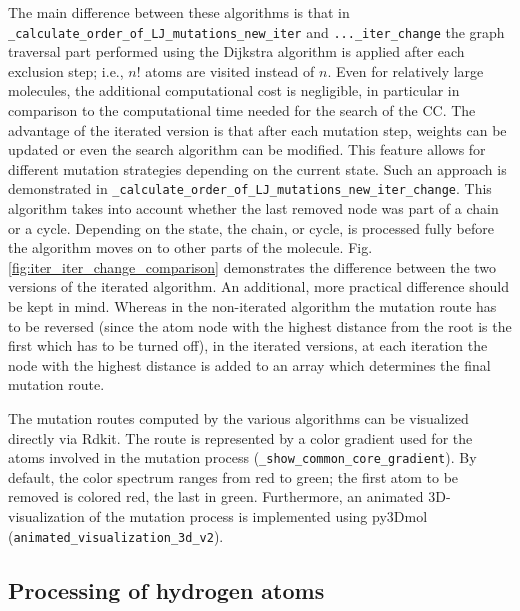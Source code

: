 The main difference between these algorithms is that in \texttt{\_calculate\_order\_of\_LJ\_mutations\_new\_iter}
and \texttt{...\_iter\_change} the graph traversal part performed
using the Dijkstra algorithm is applied after each exclusion step; i.e., $n!$ atoms are visited instead of $n$. Even for relatively large molecules, the additional computational cost is negligible, in particular in comparison
to the computational time needed for the search of the CC.
The advantage of the iterated version is that after each mutation step, weights can be
updated or even the search algorithm can be modified. 
This feature allows for different mutation strategies depending
on the current state. Such an approach is demonstrated in \texttt{\_calculate\_order\_of\_LJ\_mutations\_new\_iter\_change}.
This algorithm takes into account whether the last removed node was part of a chain or a cycle. Depending
on the state, the chain, or cycle, is processed fully before the algorithm
moves on to other parts of the molecule. Fig. \ref{fig:iter_iter_change_comparison} demonstrates the difference between the two versions of the iterated algorithm. An additional, more practical difference should be kept in mind.
Whereas in the non-iterated algorithm the mutation route has to be reversed (since the atom node with the highest distance from the root is the first which has to be turned off), in the iterated versions, at each iteration the node with the highest distance is added to an array which determines the final mutation route.

The mutation routes computed by the various algorithms can be visualized directly via Rdkit. 
The route is represented by a color gradient used for the atoms involved
in the mutation process (\texttt{\_show\_common\_core\_gradient}). By default, the color spectrum ranges from red to green; the first atom to be removed is colored red, the last in green. 
Furthermore, an animated 3D-visualization of the mutation process
is implemented using py3Dmol (\texttt{animated\_visualization\_3d\_v2})\cite{key-4}. 

\clearpage

\subsection{Processing of hydrogen atoms}


